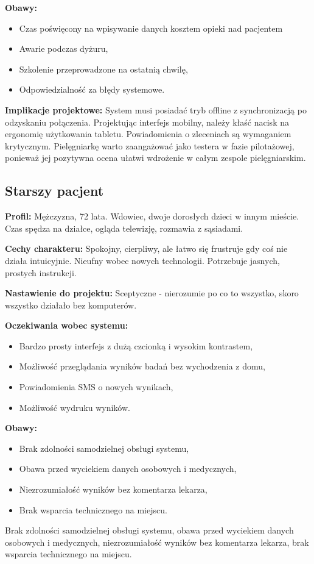 \textbf{Obawy:} 
\begin{itemize}
    \item Czas poświęcony na wpisywanie danych kosztem opieki nad pacjentem
    \item Awarie podczas dyżuru, 
    \item Szkolenie przeprowadzone na ostatnią chwilę, 
    \item Odpowiedzialność za błędy systemowe.
\end{itemize}
\textbf{Implikacje projektowe:} System musi posiadać tryb offline z synchronizacją po odzyskaniu połączenia. Projektując interfejs mobilny, należy kłaść nacisk na ergonomię użytkowania tabletu. Powiadomienia o zleceniach są wymaganiem krytycznym. Pielęgniarkę warto zaangażować jako testera w fazie pilotażowej, ponieważ jej pozytywna ocena ułatwi wdrożenie w całym zespole pielęgniarskim.

\subsection{Starszy pacjent}

\textbf{Profil:} Mężczyzna, 72 lata. Wdowiec, dwoje dorosłych dzieci w innym mieście. Czas spędza na działce, ogląda telewizję, rozmawia z sąsiadami.

\textbf{Cechy charakteru:} Spokojny, cierpliwy, ale łatwo się frustruje gdy coś nie działa intuicyjnie. Nieufny wobec nowych technologii. Potrzebuje jasnych, prostych instrukcji.

\textbf{Nastawienie do projektu:} Sceptyczne - nierozumie po co to wszystko, skoro wszystko działało bez komputerów. 

\textbf{Oczekiwania wobec systemu:}
\begin{itemize}
    \item Bardzo prosty interfejs z dużą czcionką i wysokim kontrastem,
    \item Możliwość przeglądania wyników badań bez wychodzenia z domu,
    \item Powiadomienia SMS o nowych wynikach,
    \item Możliwość wydruku wyników.
\end{itemize}

\textbf{Obawy:} 
\begin{itemize}
    \item Brak zdolności samodzielnej obsługi systemu,
    \item Obawa przed wyciekiem danych osobowych i medycznych,
    \item Niezrozumiałość wyników bez komentarza lekarza, 
    \item Brak wsparcia technicznego na miejscu.
\end{itemize}
Brak zdolności samodzielnej obsługi systemu, obawa przed wyciekiem danych osobowych i medycznych, niezrozumiałość wyników bez komentarza lekarza, brak wsparcia technicznego na miejscu.

